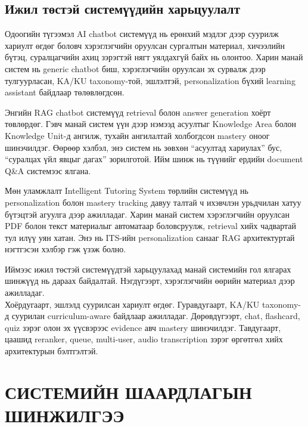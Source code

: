 \documentclass[12pt,A4]{report}
\newcommand{\eng}[1]{#1}
\begin{document}
\section{Ижил төстэй системүүдийн харьцуулалт}

Одоогийн түгээмэл \eng{AI chatbot} системүүд нь ерөнхий мэдлэг дээр суурилж хариулт өгдөг боловч хэрэглэгчийн оруулсан сургалтын материал, хичээлийн бүтэц, суралцагчийн ахиц зэрэгтэй нягт уялдахгүй байх нь олонтоо. Харин манай систем нь generic chatbot биш, хэрэглэгчийн оруулсан эх сурвалж дээр тулгуурласан, \eng{KA/KU taxonomy}-той, эшлэлтэй, personalization бүхий learning assistant байдлаар төлөвлөгдсөн.

Энгийн \eng{RAG chatbot} системүүд retrieval болон answer generation хоёрт төвлөрдөг. Гэвч манай систем үүн дээр нэмээд асуултыг \eng{Knowledge Area} болон \eng{Knowledge Unit}-д ангилж, тухайн ангилалтай холбогдсон mastery оноог шинэчилдэг. Өөрөөр хэлбэл, энэ систем нь зөвхөн ``асуултад хариулах'' бус, ``суралцах үйл явцыг дагах'' зорилготой. Ийм шинж нь түүнийг ердийн \eng{document Q\&A} системээс ялгана. 

Мөн уламжлалт \eng{Intelligent Tutoring System} төрлийн системүүд нь personalization болон mastery tracking давуу талтай ч ихэвчлэн урьдчилан хатуу бүтэцтэй агуулга дээр ажилладаг. Харин манай систем хэрэглэгчийн оруулсан \eng{PDF} болон текст материалыг автоматаар боловсруулж, retrieval хийх чадвартай тул илүү уян хатан. Энэ нь ITS-ийн personalization санааг RAG архитектуртай нэгтгэсэн хэлбэр гэж үзэж болно.

Иймээс ижил төстэй системүүдтэй харьцуулахад манай системийн гол ялгарах шинжүүд нь дараах байдалтай. Нэгдүгээрт, хэрэглэгчийн өөрийн материал дээр ажилладаг. \\ Хоёрдугаарт, эшлэлд суурилсан хариулт өгдөг. Гуравдугаарт, \eng{KA/KU taxonomy}-д суурилан curriculum-aware байдлаар ажилладаг. Дөрөвдүгээрт, \eng{chat}, \eng{flashcard}, \eng{quiz} зэрэг олон эх үүсвэрээс \eng{evidence} авч mastery шинэчилдэг. Тавдугаарт, цаашид \eng{reranker}, \eng{queue}, \eng{multi-user}, \eng{audio transcription} зэрэг өргөтгөл хийх архитектурын бэлтгэлтэй.


\chapter{СИСТЕМИЙН ШААРДЛАГЫН \\ ШИНЖИЛГЭЭ}
\end{document}
